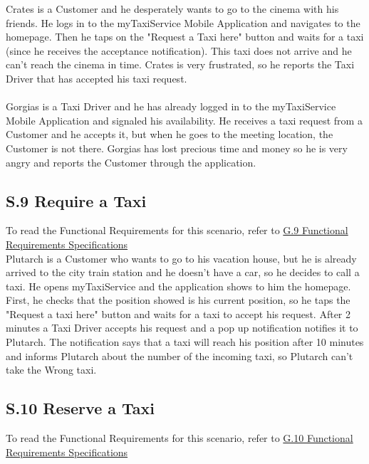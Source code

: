 		\label{sec:TaxiDriverReportingScenario}
		Crates is a Customer and he desperately wants to go to the cinema with his friends. He logs in to the myTaxiService Mobile Application and navigates to the homepage. Then he taps on the "Request a Taxi here" button and waits for a taxi (since he receives the acceptance notification). This taxi does not arrive and he can't reach the cinema in time. Crates is very frustrated, so he reports the Taxi Driver that has accepted his taxi request.
		\\
		\\
		\label{sec:CustomerReportingScenario}
		Gorgias is a Taxi Driver and he has already logged in to the myTaxiService Mobile Application and signaled his availability. He receives a taxi request from a Customer and he accepts it, but when he goes to the meeting location, the Customer is not there. Gorgias has lost precious time and money so he is very angry and reports the Customer through the application. 
		
		\subsection{S.9 Require a Taxi}\label{sec:TaxiRequiringScenario}
		To read the Functional Requirements for this scenario, refer to \hyperref[sec:frs9]{G.9 Functional Requirements Specifications}\\

		Plutarch is a Customer who wants to go to his vacation house, but he is already arrived to the city train station and he doesn't have a car, so he decides to call a taxi. He opens myTaxiService and the application shows to him the homepage. First, he checks that the position showed is his current position, so he taps the "Request a taxi here" button and waits for a taxi to accept his request. After 2 minutes a Taxi Driver accepts his request and a pop up notification notifies it to Plutarch. The notification says that a taxi will reach his position after 10 minutes and informs Plutarch about the number of the incoming taxi, so Plutarch can't take the Wrong taxi.

		\subsection{S.10 Reserve a Taxi}\label{sec:TaxiReservationScenario}
		To read the Functional Requirements for this scenario, refer to \hyperref[sec:frs10]{G.10 Functional Requirements Specifications}\\

